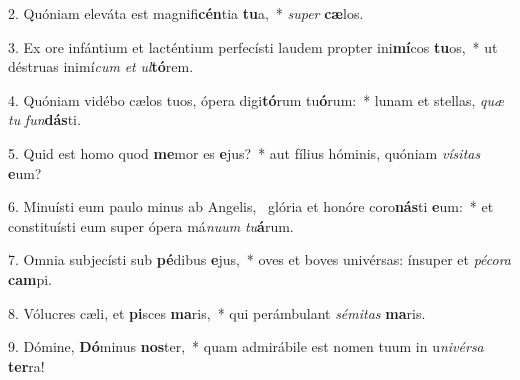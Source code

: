 2. Quóniam eleváta est magnifi\textbf{cén}tia \textbf{tu}a,~*  \textit{su}\textit{per} \textbf{cæ}los.\

3. Ex ore infántium et lacténtium perfecísti laudem propter ini\textbf{mí}cos \textbf{tu}os,~*  ut déstruas inimí\textit{cum} \textit{et} \textit{ul}\textbf{tó}rem.\

4. Quóniam vidébo cælos tuos, ópera digi\textbf{tó}rum tu\textbf{ó}rum:~*  lunam et stellas, \textit{quæ} \textit{tu} \textit{fun}\textbf{dás}ti.\

5. Quid est homo quod \textbf{me}mor es \textbf{e}jus?~*  aut fílius hóminis, quóniam \textit{ví}\textit{si}\textit{tas} \textbf{e}um?\

6. Minuísti eum paulo minus ab Angelis, \dag\  glória et honóre coro\textbf{nás}ti \textbf{e}um:~*  et constituísti eum super ópera má\textit{nu}\textit{um} \textit{tu}\textbf{á}rum.\

7. Omnia subjecísti sub \textbf{pé}dibus \textbf{e}jus,~*  oves et boves univérsas: ínsuper et \textit{pé}\textit{co}\textit{ra} \textbf{cam}pi.\

8. Vólucres cæli, et \textbf{pi}sces \textbf{ma}ris,~*  qui perámbulant \textit{sé}\textit{mi}\textit{tas} \textbf{ma}ris.\

9. Dómine, \textbf{Dó}minus \textbf{nos}ter,~*  quam admirábile est nomen tuum in u\textit{ni}\textit{vér}\textit{sa} \textbf{ter}ra!\

